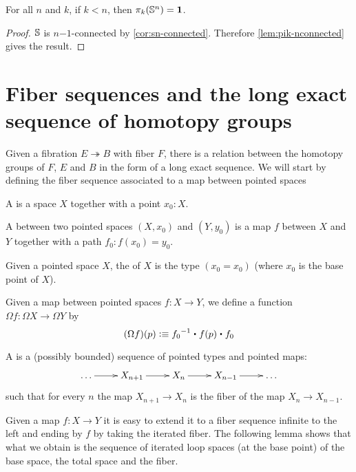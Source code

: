\begin{cor}[$\pi_{k<n}(\Sn ^n)$]
For all $n$ and $k$, if $k < n$, then $\pi_k(\mathbb{S} ^n) = \mathbf{1}$.  
\end{cor}
\begin{proof}
$\mathbb{S}$ is $n\mathord{-}1$-connected by \autoref{cor:sn-connected}.  Therefore
\autoref{lem:pik-nconnected} gives the result.  
\end{proof}

\section{Fiber sequences and the long exact sequence of homotopy groups}
\label{sec:long-exact-sequence-homotopy-groups}
Given a fibration $E\twoheadrightarrow B$ with fiber $F$, there is a relation
between the homotopy groups of $F$, $E$ and $B$ in the form of a long exact
sequence. We will start by defining the fiber sequence associated to a map
between pointed spaces

\begin{defn}
  A  is a space $X$ together with a point $x_0:X$.

  A  between two pointed spaces $(X,x_0)$ and $(Y,y_0)$ is a
  map $f$ between $X$ and $Y$ together with a path $f_0:f(x_0)=y_0$.
\end{defn}

\begin{defn}
  Given a pointed space $X$, the  of $X$ is the type
  $(x_0=x_0)$ (where $x_0$ is the base point of $X$).
\end{defn}

\begin{defn}
  Given a map between pointed spaces $f:X\to{}Y$, we define a function $\Omega
  f:\Omega X \to \Omega Y$ by
  \[(\Omega f)(p) \defeq \rev{f_0}\ct\ap{f}{p}\ct f_0\]
\end{defn}


\begin{defn}
  A  is a (possibly bounded) sequence of pointed types
  and pointed maps:
  \[\xymatrix{\dots \ar[r] & X_{n+1} \ar[r] & X_n \ar[r] & X_{n-1} \ar[r] &
    \dots}\]
  such that for every $n$ the map $X_{n+1}\to{}X_n$ is the fiber of the map
  $X_n\to{}X_{n-1}$.
\end{defn}

Given a map $f:X\to Y$ it is easy to extend it to a fiber sequence infinite to
the left and ending by $f$ by taking the iterated fiber. The following lemma
shows that what we obtain is the sequence of iterated loop spaces (at the base
point) of the base space, the total space and the fiber.

